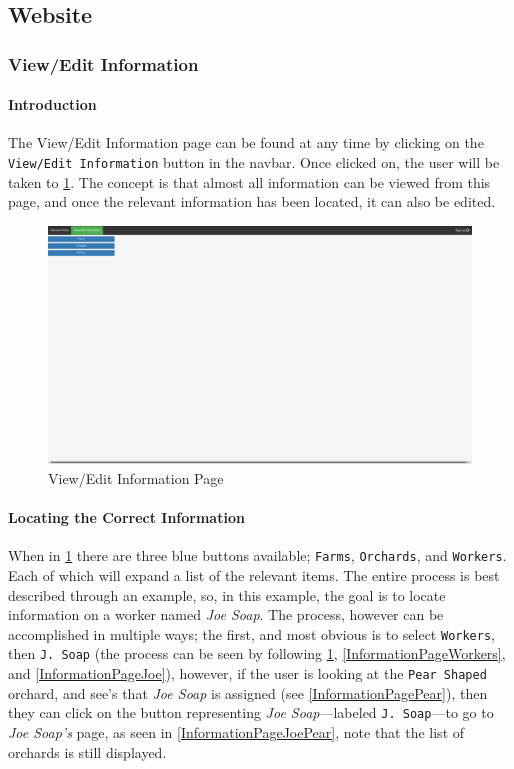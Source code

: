 \documentclass[11pt]{article}
\begin{document}
\subsection{Website}
\subsubsection{View/Edit Information}
\paragraph{Introduction}The View/Edit Information page can be found at any time by clicking on the \texttt{View/Edit Information} button in the navbar. Once clicked on, the user will be taken to \ref{InformationPage}. The concept is that almost all information can be viewed from this page, and once the relevant information has been located, it can also be edited.

\begin{figure}
 \centering
 \includegraphics[width=12cm, keepaspectratio]{Images/Information-Page.png}
 \caption{View/Edit Information Page}
 \label{InformationPage}
\end{figure}

\paragraph{Locating the Correct Information}When in \ref{InformationPage} there are three blue buttons available; \texttt{Farms}, \texttt{Orchards}, and \texttt{Workers}. Each of which will expand a list of the relevant items. The entire process is best described through an example, so, in this example, the goal is to locate information on a worker named \textit{Joe Soap}. The process, however can be accomplished in multiple ways; the first, and most obvious is to select \texttt{Workers}, then \texttt{J. Soap} (the process can be seen by following \ref{InformationPage}, \ref{InformationPageWorkers}, and \ref{InformationPageJoe}), however, if the user is looking at the \texttt{Pear Shaped} orchard, and see's that \textit{Joe Soap} is assigned (see \ref{InformationPagePear}), then they can click on the button representing \textit{Joe Soap}---labeled \texttt{J. Soap}---to go to \textit{Joe Soap's} page, as seen in \ref{InformationPageJoePear}, note that the list of orchards is still displayed.
\end{document}
